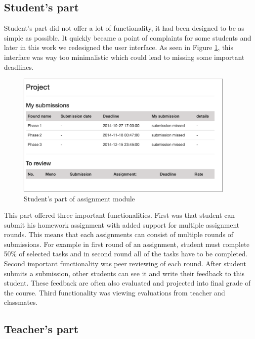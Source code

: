 \subsection{Student's part}

Student's part did not offer a lot of functionality, it had been designed to be as simple as possible. It quickly became a point of complaints for some students and later in this work we redesigned the user interface. As seen in Figure \ref{assstudent}, this interface was way too minimalistic which could lead to missing some important deadlines.

\begin{figure}[h]
    \centering
    \includegraphics[width=0.95\textwidth]{images/assstudent.png}
    \caption{Student's part of assignment module}
    \label{assstudent}
\end{figure}


This part offered three important functionalities. First was that student can submit his homework assignment with added support for multiple assignment rounds. This means that each assignments can consist of multiple rounds of submissions. For example in first round of an assignment, student must complete 50\% of selected tasks and in second round all of the tasks have to be completed. Second important functionality was peer reviewing of each round. After student submits a submission, other students can see it and write their feedback to this student. These feedback are often also evaluated and projected into final grade of the course. Third functionality was viewing evaluations from teacher and classmates.

\subsection{Teacher's part}

